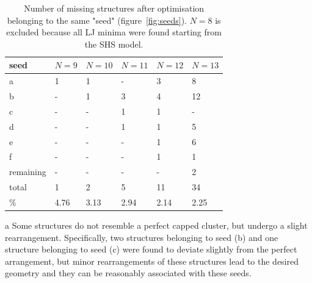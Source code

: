%
%
\begin{table}\centering
    \begin{threeparttable}
    \caption{Number of missing structures after optimisation belonging to the
    same "seed" (figure~\ref{fig:seeds}). $N=8$ is excluded because all LJ minima were
    found starting from the \acs{SHS} model.}
    \label{tab:seeds}
    \begin{tabular}{llllll}\toprule
        seed      & $N=9$   & $N=10$  & $N=11$  & $N=12$  & $N=13$  \\ \midrule
        a         & 1    & 1    & -    & 3    & 8    \\
        b         & -    & 1    & 3    & 4    & 12\tnote{a}   \\
        c         & -    & -    & 1    & 1\tnote{a}    & -    \\
        d         & -    & -    & 1    & 1    & 5    \\
        e         & -    & -    & -    & 1    & 6    \\
        f         & -    & -    & -    & 1    & 1    \\
        remaining & -    & -    & -    & -    & 2    \\ 
        total     & 1    & 2    & 5    & 11   & 34   \\
        \%        & 4.76 & 3.13 & 2.94 & 2.14 & 2.25 \\ \bottomrule
    \end{tabular}
        \begin{tablenotes}
        \item[a]{Some structures do not resemble a perfect capped
        cluster, but undergo a slight rearrangement. Specifically, two structures belonging to seed (b) and one structure belonging to seed (c) were found to deviate slightly from the perfect arrangement, but minor rearrangements of these structures lead to the desired geometry and they can be reasonably associated with these seeds.}
        \end{tablenotes}
    \end{threeparttable}
\end{table}%
%
%
